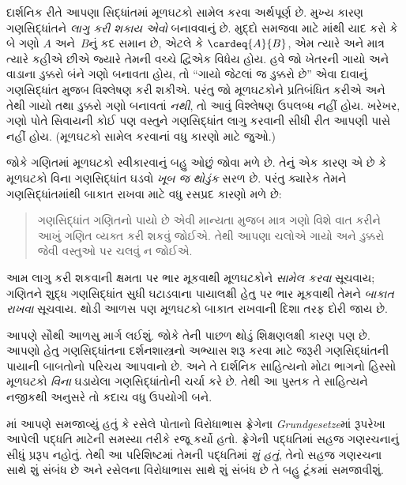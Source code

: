 દાર્શનિક રીતે આપણા સિદ્ધાંતમાં મૂળઘટકો સામેલ કરવા અર્થપૂર્ણ છે.
મુખ્ય કારણ ગણસિદ્ધાંતને \emph{લાગુ કરી શકાય એવો} બનાવવાનું છે.
મુદ્દો સમજવા માટે માંથી યાદ કરો કે બે ગણો
$A$ અને~$B$નું કદ સમાન છે, એટલે કે $\cardeq{A}{B}$, એમ ત્યારે
અને માત્ર ત્યારે કહીએ છીએ જ્યારે તેમની વચ્ચે દ્વિએક વિધેય હોય.
હવે જો ખેતરની ગાયો અને વાડાના ડુક્કરો બંને ગણો બનાવતા હોય, તો
``ગાયો જેટલાં જ ડુક્કરો છે'' એવા દાવાનું ગણસિદ્ધાંત મુજબ વિશ્લેષણ
કરી શકીએ. પરંતુ જો મૂળઘટકોને પ્રતિબંધિત કરીએ અને તેથી ગાયો તથા
ડુક્કરો ગણો બનાવતાં \emph{નથી}, તો આવું વિશ્લેષણ ઉપલબ્ધ નહીં હોય.
ખરેખર, ગણો પોતે સિવાયની કોઈ પણ વસ્તુને ગણસિદ્ધાંત લાગુ કરવાની
સીધી રીત આપણી પાસે નહીં હોય. (મૂળઘટકો સામેલ કરવાનાં વધુ કારણો
માટે \citealt[pp.~vi, 24, 50--1]{Potter2004} જુઓ.)

જોકે ગણિતમાં મૂળઘટકો સ્વીકારવાનું બહુ ઓછું જોવા મળે છે. તેનું
એક કારણ એ છે કે મૂળઘટકો વિના ગણસિદ્ધાંત ઘડવો \emph{ખૂબ જ થોડુંક}
સરળ છે. પરંતુ ક્યારેક તેમને ગણસિદ્ધાંતમાંથી બાકાત રાખવા માટે
વધુ રસપ્રદ કારણો મળે છે:
\begin{quote}
ગણસિદ્ધાંત ગણિતનો પાયો છે એવી માન્યતા મુજબ માત્ર ગણો વિશે વાત
કરીને આખું ગણિત વ્યક્ત કરી શકવું જોઈએ. તેથી આપણા ચલોએ ગાયો
અને ડુક્કરો જેવી વસ્તુઓ પર ચલવું ન જોઈએ.
\citep[p.~8]{Kunen1980}
\end{quote}
આમ લાગુ કરી શકવાની ક્ષમતા પર ભાર મૂકવાથી મૂળઘટકોને
\emph{સામેલ કરવા} સૂચવાય; ગણિતને શુદ્ધ ગણસિદ્ધાંત સુધી ઘટાડવાના
પાયાલક્ષી હેતુ પર ભાર મૂકવાથી તેમને \emph{બાકાત રાખવા} સૂચવાય.
થોડી આળસ પણ મૂળઘટકો બાકાત રાખવાની દિશા તરફ દોરી જાય છે.

આપણે સૌથી આળસુ માર્ગ લઈશું. જોકે તેની પાછળ થોડું શિક્ષણલક્ષી
કારણ પણ છે. આપણો હેતુ ગણસિદ્ધાંતના દર્શનશાસ્ત્રનો અભ્યાસ શરૂ
કરવા માટે જરૂરી ગણસિદ્ધાંતની પાયાની બાબતોનો પરિચય આપવાનો છે.
અને તે દાર્શનિક સાહિત્યનો મોટા ભાગનો હિસ્સો મૂળઘટકો
\emph{વિના} ઘડાયેલા ગણસિદ્ધાંતોની ચર્ચા કરે છે. તેથી આ પુસ્તક
તે સાહિત્યને નજીકથી અનુસરે તો કદાચ વધુ ઉપયોગી બને.
\endgroup

\begingroup
\makeatletter{}\makeatother


\label{guunit:OLP-0536}


માં આપણે સમજાવ્યું હતું કે રસેલે પોતાનો
વિરોધાભાસ ફ્રેગેના \emph{Grundgesetze}માં રૂપરેખા આપેલી પદ્ધતિ
માટેની સમસ્યા તરીકે રજૂ કર્યો હતો. ફ્રેગેની પદ્ધતિમાં સહજ ગણરચનાનું
સીધું પ્રરૂપ નહોતું. તેથી આ પરિશિષ્ટમાં તેમની પદ્ધતિમાં
\emph{શું હતું}, તેનો સહજ ગણરચના સાથે શું સંબંધ છે અને રસેલના
વિરોધાભાસ સાથે શું સંબંધ છે તે બહુ ટૂંકમાં સમજાવીશું.

